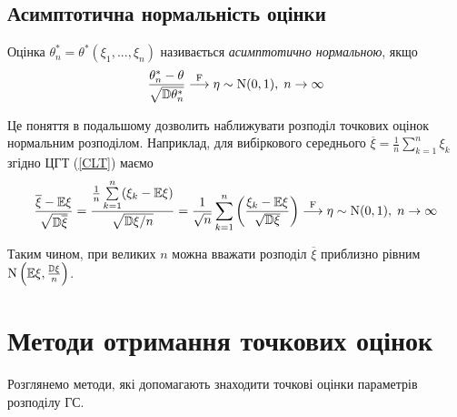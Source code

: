 \subsection{Асимптотична нормальність оцінки}
\begin{definition}
    Оцінка $\theta_n^* = \theta^* (\xi_1, ..., \xi_n)$ називається \emph{асимптотично нормальною}, якщо 
    \begin{gather}
        \frac{\theta_n^* - \theta}{\sqrt{\mathbb{D}\theta_n^*}} \overset{\mathrm{F}}{\longrightarrow} \eta \sim \mathrm{N}(0, 1), \; n \to \infty
    \end{gather}
\end{definition}
Це поняття в подальшому дозволить наближувати розподіл точкових оцінок нормальним розподілом.
Наприклад, для вибіркового середнього $\overline{\xi} = \frac{1}{n} \sum\limits_{k=1}^n \xi_k$ згідно ЦГТ (\ref{CLT}) маємо
$$ 
\frac{\overline{\xi} - \mathbb{E}\xi}{\sqrt{\mathbb{D}\overline{\xi}}} = \frac{\frac{1}{n} \sum\limits_{k=1}^n (\xi_k  -\mathbb{E}\xi)}{\sqrt{\mathbb{D}\xi/n}} = 
\frac{1}{\sqrt{n}} \sum\limits_{k=1}^n \left(\frac{\xi_k - \mathbb{E}\xi}{\sqrt{\mathbb{D}\xi}} \right)
\overset{\mathrm{F}}{\longrightarrow} \eta \sim \mathrm{N}(0, 1), \; n \to \infty
$$

Таким чином, при великих $n$ можна вважати розподіл $\overline{\xi}$ приблизно рівним $ \mathrm{N} \left(\mathbb{E}\xi, \frac{\mathbb{D}\xi}{n}\right)$.

\section{Методи отримання точкових оцінок}
Розглянемо  методи, які допомагають знаходити точкові оцінки параметрів розподілу ГС.
